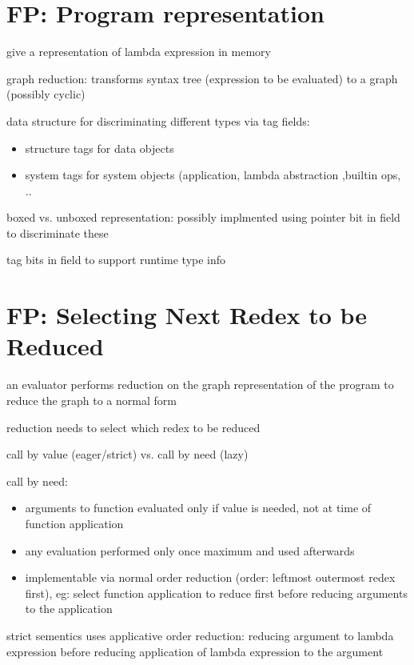\documentclass[8pt]{extarticle}
\begin{document}
\begin{multicols*}{2}
\vfill\null
\columnbreak

\section{FP: Program representation}

give a representation of lambda expression in memory

graph reduction: transforms syntax tree (expression to be evaluated) to a graph (possibly cyclic)

data structure for discriminating different types via tag fields:
\begin{itemize}
\item structure tags for data objects
\item system tags for system objects (application, lambda abstraction ,builtin ops, ..
\end{itemize}

boxed vs. unboxed representation: possibly implmented using pointer bit in field to discriminate these

tag bits in field to support runtime type info

\vfill\null
\columnbreak

\section{FP: Selecting Next Redex to be Reduced}

an evaluator performs reduction on the graph representation of the program to reduce the graph to a normal form

reduction needs to select which redex to be reduced

call by value (eager/strict) vs. call by need (lazy)

call by need:
\begin{itemize}
\item arguments to function evaluated only if value is needed, not at time of function application
\item any evaluation performed only once maximum and used afterwards
\item implementable via normal order reduction (order: leftmost outermost redex first), eg: select function application to reduce first before reducing arguments to the application
\end{itemize}

strict sementics uses applicative order reduction: reducing argument to lambda expression before reducing application of lambda expression to the argument


\end{multicols*}
\end{document}

